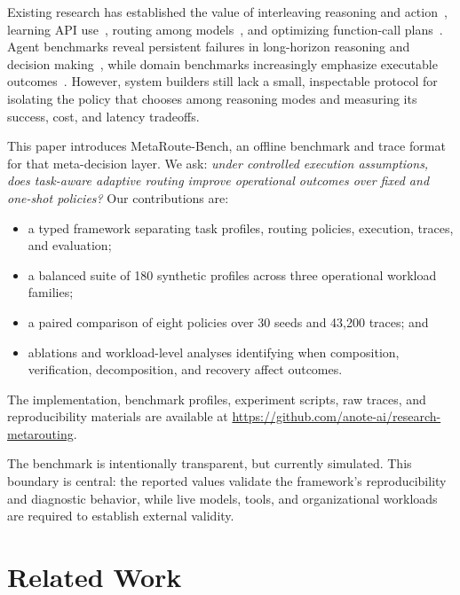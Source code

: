 \documentclass[sigconf]{acmart}
\begin{document}
Existing research has established the value of interleaving reasoning and action~\cite{yao2023react}, learning API use~\cite{schick2023toolformer,qin2024toolllm}, routing among models~\cite{chen2024frugalgpt,ong2025routellm}, and optimizing function-call plans~\cite{kim2024llmcompiler}. Agent benchmarks reveal persistent failures in long-horizon reasoning and decision making~\cite{liu2024agentbench}, while domain benchmarks increasingly emphasize executable outcomes~\cite{jimenez2024swebench,yao2024taubench}. However, system builders still lack a small, inspectable protocol for isolating the policy that chooses among reasoning modes and measuring its success, cost, and latency tradeoffs.

This paper introduces MetaRoute-Bench, an offline benchmark and trace format for that meta-decision layer. We ask: \emph{under controlled execution assumptions, does task-aware adaptive routing improve operational outcomes over fixed and one-shot policies?} Our contributions are:

\begin{itemize}
  \item a typed framework separating task profiles, routing policies, execution, traces, and evaluation;
  \item a balanced suite of 180 synthetic profiles across three operational workload families;
  \item a paired comparison of eight policies over 30 seeds and 43,200 traces; and
  \item ablations and workload-level analyses identifying when composition, verification, decomposition, and recovery affect outcomes.
\end{itemize}

The implementation, benchmark profiles, experiment scripts, raw traces, and reproducibility materials are available at \url{https://github.com/anote-ai/research-metarouting}.

The benchmark is intentionally transparent, but currently simulated. This boundary is central: the reported values validate the framework's reproducibility and diagnostic behavior, while live models, tools, and organizational workloads are required to establish external validity.

\section{Related Work}
\end{document}
